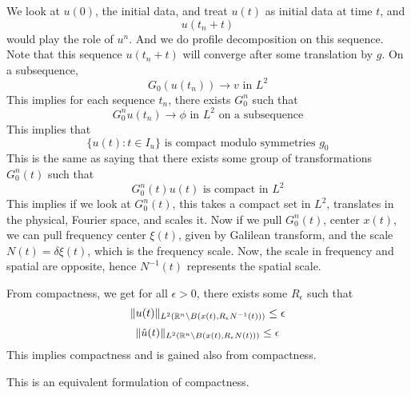 We look at $u(0)$, the initial data, and treat $u(t)$ as initial data at time $t$, and 
\begin{equation*}
    u(t_n+t)
\end{equation*}
would play the role of $u^n$. And we do profile decomposition on this sequence. Note that this sequence $u(t_n+t)$ will converge after some translation by $g$. On a subsequence, 
\begin{equation*}
    G_0(u(t_n))\to v \text{ in } L^2
\end{equation*}
This implies for each sequence $t_n$, there exists $G_0^n$ such that 
\begin{equation*}
    G_0^nu(t_n)\to\phi \text{ in } L^2 \text{ on a subsequence}
\end{equation*}
This implies that 
\begin{equation*}
    \{u(t): t\in I_u\} \text{ is compact modulo symmetries } g_0
\end{equation*}
This is the same as saying that there exists some group of transformations $G_0^n(t)$ such that 
\begin{equation*}
    G_0^n(t)u(t) \text{ is compact in } L^2
\end{equation*}
This implies if we look at $G_0^n(t)$, this takes a compact set in $L^2$, translates in the physical, Fourier space, and scales it. Now if we pull $G_0^n(t)$, center $x(t)$, we can pull frequency center $\xi(t)$, given by Galilean transform, and the scale $N(t)=\delta\xi(t)$, which is the frequency scale. Now, the scale in frequency and spatial are opposite, hence $N^{-1}(t)$ represents the spatial scale.

From compactness, we get for all $\epsilon>0$, there exists some $R_\epsilon$ such that 
\begin{equation*}
    \|u(t)\|_{L^2(\mathbb{R}^n\setminus B(x(t),R_\epsilon N^{-1}(t)))}\leq\epsilon
\end{equation*}
\begin{equation*}
    \|\hat{u}(t)\|_{L^2(\mathbb{R}^n\setminus B(x(t), R_\epsilon N(t)))}\leq\epsilon
\end{equation*}
This implies compactness and is gained also from compactness.

This is an equivalent formulation of compactness.


